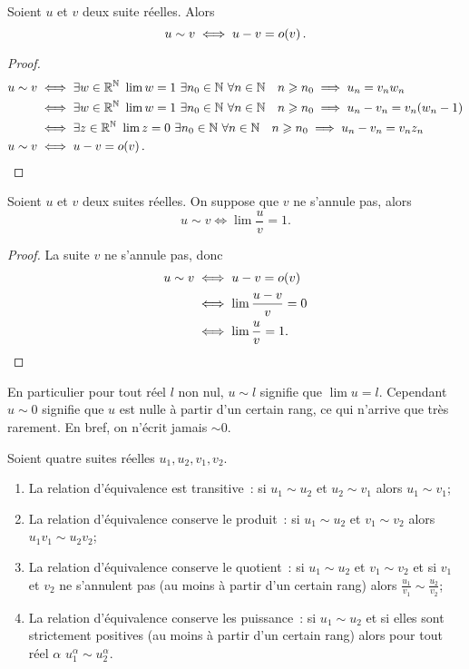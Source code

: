 \begin{prop}
  Soient \(u\) et \(v\) deux suite réelles. Alors
  \begin{equation}
    u \sim v \iff u-v = o\mathopen{}\left(v\right).
  \end{equation}
\end{prop}
\begin{proof}
  \begin{align}
    u \sim v & \iff \exists w \in \R^\N \ \lim w =1 \ \exists n_0 \in \N \ \forall n \in \N \quad n \geqslant n_0 \implies u_n= v_n w_n \\
    & \iff \exists w \in \R^\N \ \lim w =1 \ \exists n_0 \in \N \ \forall n \in \N \quad n \geqslant n_0 \implies u_n-v_n= v_n (w_n -1) \\
    & \iff \exists z \in \R^\N \ \lim z =0 \ \exists n_0 \in \N \ \forall n \in \N \quad n \geqslant n_0 \implies u_n-v_n= v_n z_n \\
    u \sim v & \iff u-v = \petito{v}.
  \end{align}
\end{proof}
\begin{prop}
  Soient \(u\) et \(v\) deux suites réelles. On suppose que \(v\) ne s'annule pas, alors
  \begin{equation}
    u \sim v \iff \lim \frac{u}{v} = 1.
  \end{equation}
\end{prop}
\begin{proof}
  La suite \(v\) ne s'annule pas, donc
  \begin{align}
    u \sim v & \iff u-v = o\mathopen{}\left(v\right) \\
    & \iff \lim \frac{u-v}{v} =0 \\
    & \iff \lim \frac{u}{v} =1.
  \end{align}
\end{proof}
En particulier pour tout réel \(l\) non nul, \(u \sim l\) signifie que \(\lim u =l\). Cependant \(u \sim 0\) signifie que \(u\) est nulle à partir d'un certain rang, ce qui n'arrive que très rarement. En bref, on n'écrit jamais \(\sim 0\).
\begin{prop}
  Soient quatre suites réelles \(u_1, u_2, v_1, v_2\).
  \begin{enumerate}
  \item La relation d'équivalence est transitive~: si \(u_1 \sim u_2\) et \(u_2 \sim v_1\) alors \(u_1 \sim v_1\);  
  \item La relation d'équivalence conserve le produit~: si \(u_1 \sim u_2\) et \(v_1 \sim v_2\) alors \(u_1 v_1 \sim u_2 v_2\);
  \item La relation d'équivalence conserve le quotient~: si \(u_1 \sim u_2\) et \(v_1 \sim v_2\) et si \(v_1\) et \(v_2\) ne s'annulent pas (au moins à partir d'un certain rang) alors \(\frac{u_1}{v_1} \sim \frac{u_2}{v_2}\);
  \item La relation d'équivalence conserve les puissance~: si \(u_1 \sim u_2\) et si elles sont strictement positives (au moins à partir d'un certain rang) alors pour tout réel \(\alpha\) \(u_1^\alpha \sim u_2^\alpha\).
  \end{enumerate}
\end{prop}

